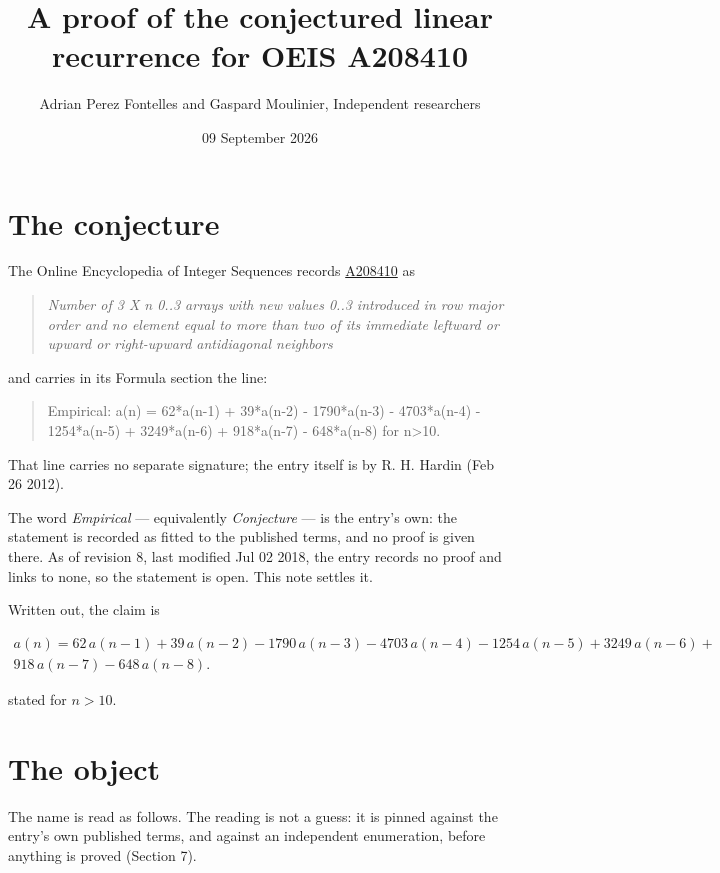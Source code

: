 \documentclass[11pt]{article}
\title{A proof of the conjectured linear recurrence for OEIS A208410}
\author{Adrian Perez Fontelles and Gaspard Moulinier, Independent researchers}
\date{09 September 2026}
\theoremstyle{definition}
\begin{document}
\maketitle
\section{The conjecture}

The Online Encyclopedia of Integer Sequences records \href{https://oeis.org/A208410}{A208410} as

\begin{quote}\itshape Number of 3 X n 0..3 arrays with new values 0..3 introduced in row major order and no element equal to more than two of its immediate leftward or upward or right-upward antidiagonal neighbors\end{quote}

and carries in its Formula section the line:

\begin{quote}\ttfamily Empirical: a(n) = 62*a(n-1) + 39*a(n-2) - 1790*a(n-3) - 4703*a(n-4) - 1254*a(n-5) + 3249*a(n-6) + 918*a(n-7) - 648*a(n-8) for n>10.\end{quote}

That line carries no separate signature; the entry itself is by R. H. Hardin (Feb 26 2012).

The word {\itshape Empirical} --- equivalently {\itshape Conjecture} --- is the entry's own: the statement is recorded as fitted to the published terms, and no proof is given there. As of revision 8, last modified Jul 02 2018, the entry records no proof and links to none, so the statement is open. This note settles it.

Written out, the claim is

\begin{multline*} a(n) = 62\,a(n-1) + 39\,a(n-2) - 1790\,a(n-3) - 4703\,a(n-4) - 1254\,a(n-5) + 3249\,a(n-6) + \\ 918\,a(n-7) - 648\,a(n-8). \end{multline*}

stated for $n > 10$.

\section{The object}

The name is read as follows. The reading is not a guess: it is pinned against the entry's own published terms, and against an independent enumeration, before anything is proved (Section 7).
\end{document}
